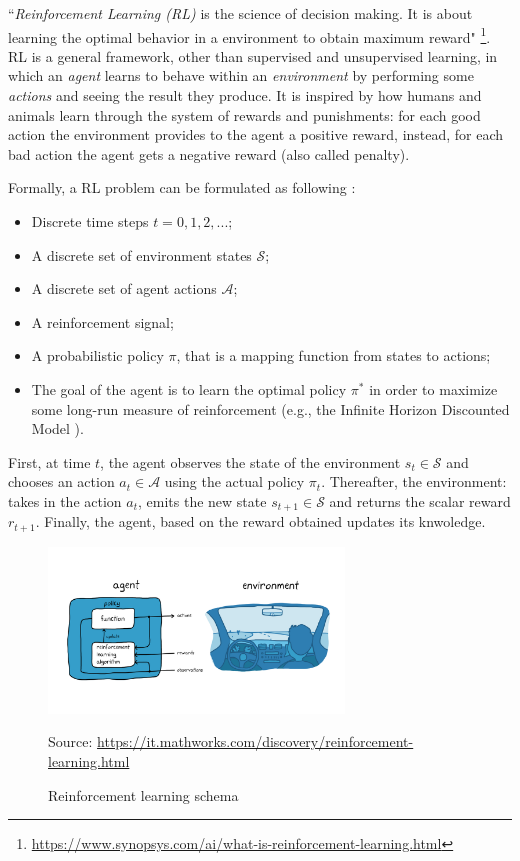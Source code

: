 \documentclass[12pt,a4paper,openright,twoside]{book}
\newcommand{\fonte}[1]{{\color{gray} \small \hypersetup{citecolor=gray} Source: #1}}
\begin{document}
``\emph{Reinforcement Learning (RL)} is the science of decision making. It is about learning the optimal behavior 
    in a environment to obtain maximum reward" 
    \footnote{\url{https://www.synopsys.com/ai/what-is-reinforcement-learning.html}}.
    RL is a general framework, other than supervised and unsupervised learning, in which an \emph{agent} learns 
    to behave within an \emph{environment} by performing some \emph{actions} and seeing the result they produce.
    It is inspired by how humans and animals learn through the system of rewards and punishments: for each good action
    the environment provides to the agent a positive reward, instead, for each bad action the agent gets a negative 
    reward (also called penalty).

Formally, a RL problem can be formulated as following \cite{RLSurvey}:
    \begin{itemize}
        \item Discrete time steps $t=0, 1, 2, ...$;
        \item A discrete set of environment states $\mathcal{S}$;
        \item A discrete set of agent actions $\mathcal{A}$;
        \item A reinforcement signal;
        \item A probabilistic policy $\pi$, that is a mapping function from states to actions;
        \item The goal of the agent is to learn the optimal policy $\pi^*$ in order to maximize 
                some long-run measure of reinforcement (e.g., the Infinite Horizon Discounted Model \cite{RLSurvey}).
    \end{itemize}
    First, at time $t$, the agent observes the state of the environment $s_t \in \mathcal{S}$
        and chooses an action $a_t \in \mathcal{A}$ using the actual policy $\pi_t$. 
        Thereafter, the environment: takes in the action $a_t$, emits the new state $s_{t+1} \in \mathcal{S}$ 
        and returns the scalar reward $r_{t+1}$.
        Finally, the agent, based on the reward obtained updates its knwoledge.

    \begin{figure}[t]
        \centering
        \includegraphics[width=0.7\textwidth]{figures/rl.png}
        \caption{Reinforcement learning schema}
        \fonte{\url{https://it.mathworks.com/discovery/reinforcement-learning.html}}
        \label{fig:rl_schema}
    \end{figure}
\end{document}
